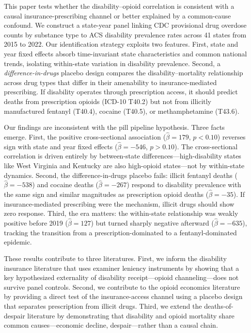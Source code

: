 \documentclass[12pt]{article}
\begin{document}
This paper tests whether the disability--opioid correlation is consistent with a causal insurance-prescribing channel or better explained by a common-cause confound. We construct a state-year panel linking CDC provisional drug overdose counts by substance type to ACS disability prevalence rates across 41 states from 2015 to 2022. Our identification strategy exploits two features. First, state and year fixed effects absorb time-invariant state characteristics and common national trends, isolating within-state variation in disability prevalence. Second, a \textit{difference-in-drugs} placebo design compares the disability--mortality relationship across drug types that differ in their amenability to insurance-mediated prescribing. If disability operates through prescription access, it should predict deaths from prescription opioids (ICD-10 T40.2) but not from illicitly manufactured fentanyl (T40.4), cocaine (T40.5), or methamphetamine (T43.6).

Our findings are inconsistent with the pill pipeline hypothesis. Three facts emerge. First, the positive cross-sectional association ($\hat{\beta} = 179$, $p < 0.10$) reverses sign with state and year fixed effects ($\hat{\beta} = -546$, $p > 0.10$). The cross-sectional correlation is driven entirely by between-state differences---high-disability states like West Virginia and Kentucky are also high-opioid states---not by within-state dynamics. Second, the difference-in-drugs placebo fails: illicit fentanyl deaths ($\hat{\beta} = -538$) and cocaine deaths ($\hat{\beta} = -267$) respond to disability prevalence with the same sign and similar magnitudes as prescription opioid deaths ($\hat{\beta} = -35$). If insurance-mediated prescribing were the mechanism, illicit drugs should show zero response. Third, the era matters: the within-state relationship was weakly positive before 2019 ($\hat{\beta} = 127$) but turned sharply negative afterward ($\hat{\beta} = -635$), tracking the transition from a prescription-dominated to a fentanyl-dominated epidemic.

These results contribute to three literatures. First, we inform the disability insurance literature that uses examiner leniency instruments \citep{maestas2013, autor2019, gelber2024, dahl2014} by showing that a key hypothesized externality of disability receipt---opioid channeling---does not survive panel controls. Second, we contribute to the opioid economics literature \citep{ruhm2019, alpert2022, evans2019, cutler2022} by providing a direct test of the insurance-access channel using a placebo design that separates prescription from illicit drugs. Third, we extend the deaths-of-despair literature \citep{case2015, case2017, hollingsworth2017} by demonstrating that disability and opioid mortality share common causes---economic decline, despair---rather than a causal chain.
\end{document}

